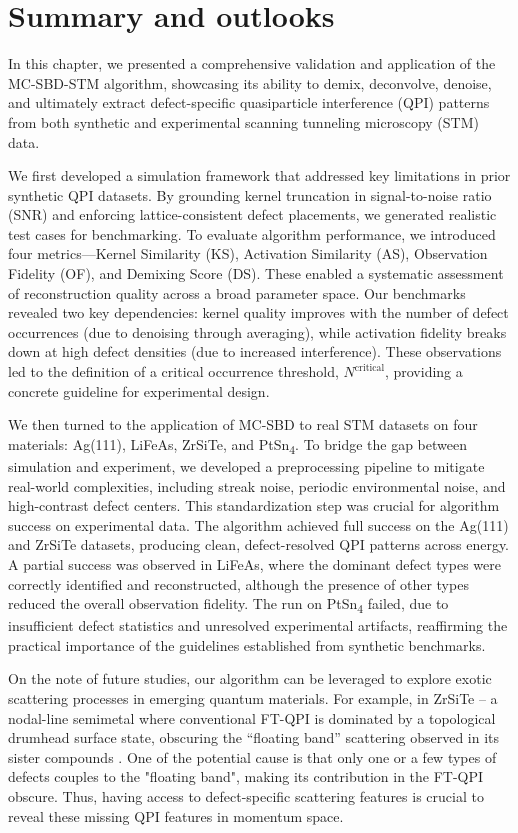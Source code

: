\section{Summary and outlooks}
In this chapter, we presented a comprehensive validation and application of the MC-SBD-STM algorithm, showcasing its ability to demix, deconvolve, denoise, and ultimately extract defect-specific quasiparticle interference (QPI) patterns from both synthetic and experimental scanning tunneling microscopy (STM) data.

We first developed a simulation framework that addressed key limitations in prior synthetic QPI datasets. By grounding kernel truncation in signal-to-noise ratio (SNR) and enforcing lattice-consistent defect placements, we generated realistic test cases for benchmarking. To evaluate algorithm performance, we introduced four metrics—Kernel Similarity (KS), Activation Similarity (AS), Observation Fidelity (OF), and Demixing Score (DS). These enabled a systematic assessment of reconstruction quality across a broad parameter space. Our benchmarks revealed two key dependencies: kernel quality improves with the number of defect occurrences (due to denoising through averaging), while activation fidelity breaks down at high defect densities (due to increased interference). These observations led to the definition of a critical occurrence threshold, $N^{\text{critical}}$, providing a concrete guideline for experimental design. 

We then turned to the application of \ac{MC-SBD} to real STM datasets on four materials: Ag(111), LiFeAs, ZrSiTe, and PtSn\textsubscript{4}. To bridge the gap between simulation and experiment, we developed a preprocessing pipeline to mitigate real-world complexities, including streak noise, periodic environmental noise, and high-contrast defect centers. This standardization step was crucial for algorithm success on experimental data. The algorithm achieved full success on the Ag(111) and ZrSiTe datasets, producing clean, defect-resolved QPI patterns across energy. A partial success was observed in LiFeAs, where the dominant defect types were correctly identified and reconstructed, although the presence of other types reduced the overall observation fidelity. The run on PtSn\textsubscript{4} failed, due to insufficient defect statistics and unresolved experimental artifacts, reaffirming the practical importance of the guidelines established from synthetic benchmarks.

On the note of future studies, our algorithm can be leveraged to explore exotic scattering processes in emerging quantum materials. For example, in ZrSiTe – a nodal-line semimetal where conventional FT-QPI is dominated by a topological drumhead surface state, obscuring the “floating band” scattering observed in its sister compounds \cite{stuartQuasiparticleInterferenceObservation2022}\cite{butlerQuasiparticleInterferenceZrSiS2017}. One of the potential cause is that only one or a few types of defects couples to the "floating band", making its contribution in the FT-QPI obscure. Thus, having access to defect-specific scattering features is crucial to reveal these missing QPI features in momentum space.

